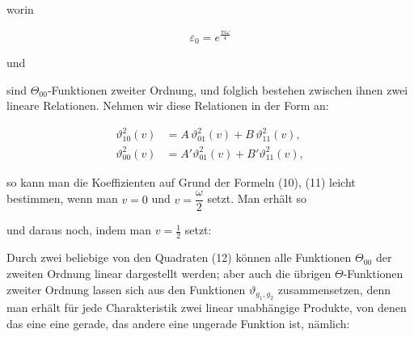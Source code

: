 
worin

\[
\varepsilon_0 = e^{\frac{\pi i \omega}{4}}
\]

und




sind $\Theta_{00}$-Funktionen zweiter Ordnung, und folglich bestehen
zwischen ihnen zwei lineare Relationen. Nehmen wir diese Relationen
 in der Form an:

\[
\begin{aligned}
\vartheta_{10}^2(v) &= A\,\vartheta_{01}^2(v) + B\,\vartheta_{11}^2(v),\\
\vartheta_{00}^2(v) &= A'\vartheta_{01}^2(v) + B'\vartheta_{11}^2(v),
\end{aligned}
\]

so kann man die Koeffizienten auf Grund der Formeln (10), (11)
leicht bestimmen, wenn man $v = 0$ und $v = \dfrac{\omega}{2}$ setzt. Man
erhält so


und daraus noch, indem man $v = \tfrac{1}{2}$ setzt:


Durch zwei beliebige von den Quadraten (12) können alle
Funktionen $\Theta_{00}$ der zweiten Ordnung linear dargestellt werden;
aber auch die übrigen $\Theta$-Funktionen zweiter Ordnung lassen sich
aus den Funktionen $\vartheta_{g_1,g_2}$ zusammensetzen, denn man erhält für
jede Charakteristik zwei linear unabhängige Produkte, von denen
das eine eine gerade, das andere eine ungerade Funktion ist,
nämlich:


